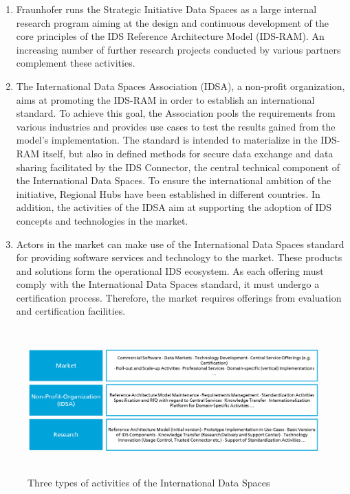 \begin{enumerate}
	\item Fraunhofer runs the Strategic Initiative Data Spaces as a large internal research program aiming at the design and continuous development of the core principles of the IDS Reference Architecture Model (IDS-RAM). An increasing number of further research projects conducted by various partners complement these activities.  


	\item  The International Data Spaces Association (IDSA), a non-profit organization, aims at promoting the IDS-RAM in order to establish an international standard. To achieve this goal, the Association pools the requirements from various industries and provides use cases to test the results gained from the model’s implementation. The standard is intended to materialize in the IDS-RAM itself, but also in defined methods for secure data exchange and data sharing facilitated by the IDS Connector, the central technical component of the International Data Spaces. To ensure the international ambition of the initiative, Regional Hubs have been established in different countries. In addition, the activities of the IDSA aim at supporting the adoption of IDS concepts and technologies in the market. 

	\item Actors in the market can make use of the International Data Spaces standard for providing software services and technology to the market. These products and solutions form the operational IDS ecosystem. As each offering must comply with the International Data Spaces standard, it must undergo a certification process. Therefore, the market requires offerings from evaluation and certification facilities.
\end{enumerate}




\begin{figure}[H]
	\begin{Center}
		\includegraphics[width=6.35in,height=2.2in]{./media/image10.png}
		\caption{ Three types of activities of the International Data Spaces}
		\label{fig:_Three_types_of_activities_of_the_International_Data_Spaces}
	\end{Center}
\end{figure}


